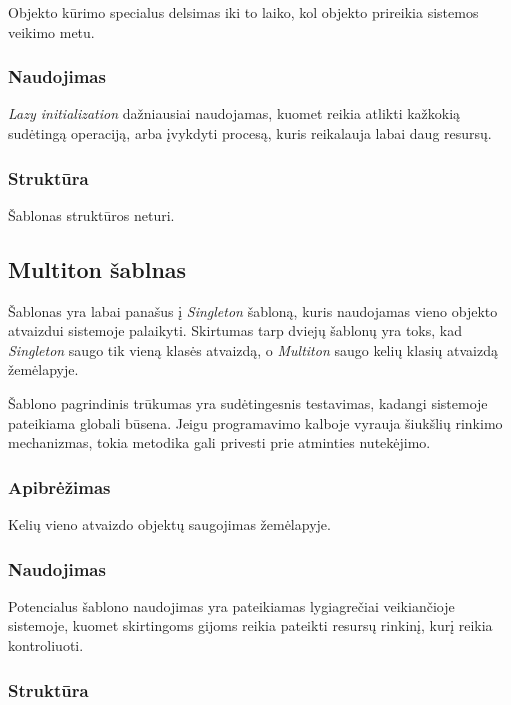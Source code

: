 \documentclass[10pt]{IEEEtran}
\begin{document}
				Objekto kūrimo specialus delsimas iki to laiko, kol objekto prireikia sistemos veikimo metu.

			\subsubsection{Naudojimas}

				\textit{Lazy initialization} dažniausiai naudojamas, kuomet reikia atlikti kažkokią sudėtingą operaciją, arba įvykdyti procesą, kuris reikalauja labai daug resursų.

			\subsubsection{Struktūra}

				Šablonas struktūros neturi.

		\subsection{Multiton šablnas}

			Šablonas yra labai panašus į \textit{Singleton} šabloną, kuris naudojamas vieno objekto atvaizdui sistemoje palaikyti. Skirtumas tarp dviejų šablonų yra toks, kad \textit{Singleton} saugo tik vieną klasės atvaizdą, o \textit{Multiton} saugo kelių klasių atvaizdą žemėlapyje.

			Šablono pagrindinis trūkumas yra sudėtingesnis testavimas, kadangi sistemoje pateikiama globali būsena. Jeigu programavimo kalboje vyrauja šiukšlių rinkimo mechanizmas, tokia metodika gali privesti prie atminties nutekėjimo.

			\subsubsection{Apibrėžimas}

				Kelių vieno atvaizdo objektų saugojimas žemėlapyje.

			\subsubsection{Naudojimas}

				Potencialus šablono naudojimas yra pateikiamas lygiagrečiai veikiančioje sistemoje, kuomet skirtingoms gijoms reikia pateikti resursų rinkinį, kurį reikia kontroliuoti.

			\subsubsection{Struktūra}
\end{document}
